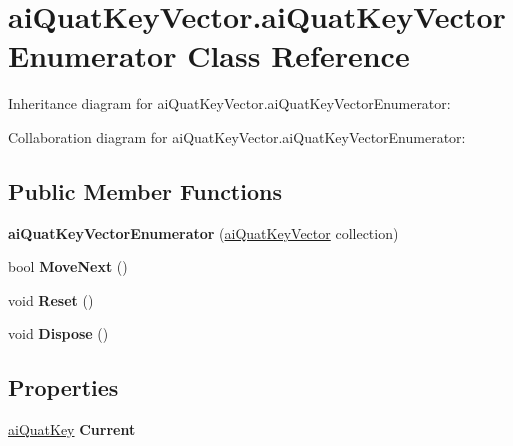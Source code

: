 \hypertarget{classai_quat_key_vector_1_1ai_quat_key_vector_enumerator}{\section{ai\+Quat\+Key\+Vector.\+ai\+Quat\+Key\+Vector\+Enumerator Class Reference}
\label{classai_quat_key_vector_1_1ai_quat_key_vector_enumerator}
}


Inheritance diagram for ai\+Quat\+Key\+Vector.\+ai\+Quat\+Key\+Vector\+Enumerator\+:


Collaboration diagram for ai\+Quat\+Key\+Vector.\+ai\+Quat\+Key\+Vector\+Enumerator\+:
\subsection*{Public Member Functions}
\begin{DoxyCompactItemize}
\item 
\hypertarget{classai_quat_key_vector_1_1ai_quat_key_vector_enumerator_a00a6520de0d82e4c75e37b8ee7159e41}{{\bfseries ai\+Quat\+Key\+Vector\+Enumerator} (\hyperlink{classai_quat_key_vector}{ai\+Quat\+Key\+Vector} collection)}\label{classai_quat_key_vector_1_1ai_quat_key_vector_enumerator_a00a6520de0d82e4c75e37b8ee7159e41}

\item 
\hypertarget{classai_quat_key_vector_1_1ai_quat_key_vector_enumerator_a6f7b26c9d8a09f71f97c59d6c1ffe4ea}{bool {\bfseries Move\+Next} ()}\label{classai_quat_key_vector_1_1ai_quat_key_vector_enumerator_a6f7b26c9d8a09f71f97c59d6c1ffe4ea}

\item 
\hypertarget{classai_quat_key_vector_1_1ai_quat_key_vector_enumerator_afbcc74cc9cae66743b9de09b7ffa2676}{void {\bfseries Reset} ()}\label{classai_quat_key_vector_1_1ai_quat_key_vector_enumerator_afbcc74cc9cae66743b9de09b7ffa2676}

\item 
\hypertarget{classai_quat_key_vector_1_1ai_quat_key_vector_enumerator_a6dbd35d84d77e4bcfdedad9dec38fe8e}{void {\bfseries Dispose} ()}\label{classai_quat_key_vector_1_1ai_quat_key_vector_enumerator_a6dbd35d84d77e4bcfdedad9dec38fe8e}

\end{DoxyCompactItemize}
\subsection*{Properties}
\begin{DoxyCompactItemize}
\item 
\hypertarget{classai_quat_key_vector_1_1ai_quat_key_vector_enumerator_aa7f441ce5a310970931fecdee95fb1af}{\hyperlink{structai_quat_key}{ai\+Quat\+Key} {\bfseries Current}}\label{classai_quat_key_vector_1_1ai_quat_key_vector_enumerator_aa7f441ce5a310970931fecdee95fb1af}

\end{DoxyCompactItemize}


